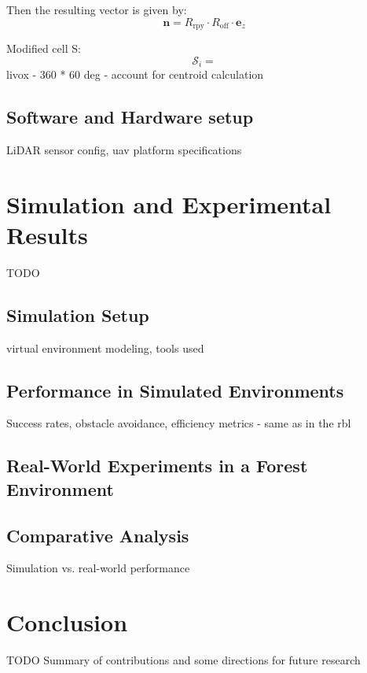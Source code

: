             Then the resulting vector is given by:  
            \[
            \mathbf{n} = R_{\text{rpy}} \cdot R_{\text{off}} \cdot \mathbf{e}_z
            \]

            Modified cell S:
            \begin{equation}
                \mathcal{S}_i = {} 
            \end{equation}
            livox - 360 * 60 deg - account for centroid calculation
        \subsection{Software and Hardware setup}
            LiDAR sensor config, uav platform specifications
    
    \section{Simulation and Experimental Results}
        TODO
        \subsection{Simulation Setup}
            virtual environment modeling, tools used
        \subsection{Performance in Simulated Environments}
            Success rates, obstacle avoidance, efficiency metrics - same as in the rbl
        \subsection{Real-World Experiments in a Forest Environment}
        \subsection{Comparative Analysis}
            Simulation vs. real-world performance
    
    \section{Conclusion}
        TODO
        Summary of contributions and some directions for future research
    








